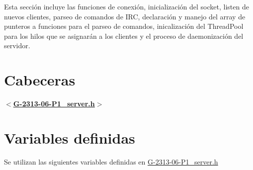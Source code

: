Esta sección incluye las funciones de conexión, inicialización del socket, listen de nuevos clientes, parseo de comandos de I\+R\+C, declaración y manejo del array de punteros a funciones para el parseo de comandos, inicalización del Thread\+Pool para los hilos que se asignarán a los clientes y el proceso de daemonización del servidor.\hypertarget{server_connection_cabeceras}{}\section{Cabeceras}\label{server_connection_cabeceras}
{ {\bfseries $<$\hyperlink{G-2313-06-P1__server_8h}{G-\/2313-\/06-\/\+P1\+\_\+server.\+h}$>$} } \hypertarget{server_connection_variables}{}\section{Variables definidas}\label{server_connection_variables}
Se utilizan las siguientes variables definidas en \hyperlink{G-2313-06-P1__server_8h}{G-\/2313-\/06-\/\+P1\+\_\+server.\+h} 

